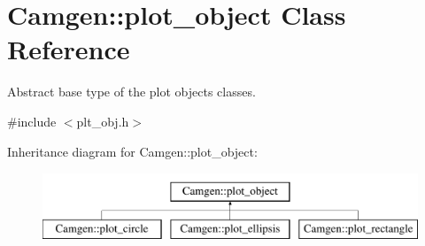 \hypertarget{a00429}{}\section{Camgen\+:\+:plot\+\_\+object Class Reference}
\label{a00429}


Abstract base type of the plot objects classes.  




{\ttfamily \#include $<$plt\+\_\+obj.\+h$>$}

Inheritance diagram for Camgen\+:\+:plot\+\_\+object\+:\begin{figure}[H]
\begin{center}
\leavevmode
\includegraphics[height=2.000000cm]{a00429}
\end{center}
\end{figure}
